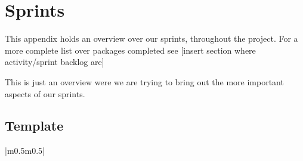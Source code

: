 \chapter{Sprints}
\label{chap:sprints}

This appendix holds an overview over our sprints, throughout the
project. For a more complete list over packages completed see [insert
section where activity/sprint backlog are]

This is just an overview were we are trying to bring out the more
important aspects of our sprints. 

\section{Template}
\begin{center}
\begin{supertabular}{|m{0.5\textwidth}m{0.5\textwidth}|}
\\\hline
{}\\\hline
{}\\\hline
{}\\\hline
{}\\\hline
\end{supertabular}
\end{center}
\clearpage

